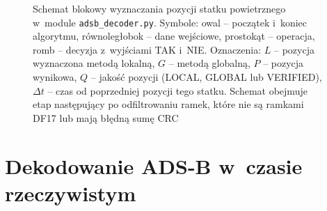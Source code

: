 \begin{figure}[!htb]
\caption{Schemat blokowy wyznaczania pozycji statku powietrznego w~module
\texttt{adsb\_decoder.py}. Symbole: owal -- początek i~koniec algorytmu,
równoległobok -- dane wejściowe, prostokąt -- operacja, romb -- decyzja
z~wyjściami TAK i~NIE. Oznaczenia: $L$ -- pozycja wyznaczona metodą lokalną,
$G$ -- metodą globalną, $P$ -- pozycja wynikowa, $Q$ -- jakość pozycji
(LOCAL, GLOBAL lub VERIFIED), $\Delta t$ -- czas od poprzedniej pozycji tego
statku. Schemat obejmuje etap następujący po odfiltrowaniu ramek, które nie
są ramkami DF17 lub mają błędną sumę CRC}
\label{rys:schemat_pozycja}
\end{figure}






\section{Dekodowanie ADS-B w~czasie rzeczywistym}
\label{sec:dekodowanie}

